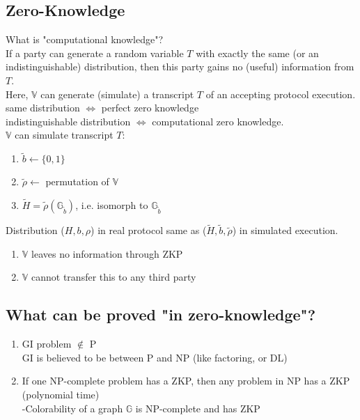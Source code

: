 \documentclass{report}
\begin{document}
		\subsection{Zero-Knowledge}
		\startsubsection
			What is "computational knowledge"? \\
			If a party can generate a random variable $T$ with exactly the same (or an indistinguishable) distribution, then this party gains no (useful) information from $T$. \\
			Here, $\mathbb{V}$ can generate (simulate) a transcript $T$ of an accepting protocol execution. \\
			same distribution $\Leftrightarrow$ perfect zero knowledge \\
			indistinguishable distribution $\Leftrightarrow$ computational zero knowledge. \\
			$\mathbb{V}$ can simulate transcript $T$:
			\begin{enumerate}
				\item $\tilde{b} \leftarrow \{ 0,1 \}$
				\item $\tilde{\rho} \leftarrow$ permutation of $\mathbb{V}$
				\item $\tilde{H} = \tilde{\rho} (\mathbb{G}_{\tilde{b}})$, i.e. isomorph to $\mathbb{G}_{\tilde{b}}$
			\end{enumerate}
			Distribution ($H, b, \rho$) in real protocol same as ($\tilde{H}, \tilde{b}, \tilde{\rho}$) in simulated execution.
			\begin{enumerate}[$\Rightarrow$]
				\item $\mathbb{V}$ leaves no information through ZKP
				\item $\mathbb{V} $ cannot transfer this to any third party
			\end{enumerate}
		\closesection
		\subsection{What can be proved "in zero-knowledge"?}
		\startsubsection
			\begin{enumerate}[-]
				\item GI problem $\not\in$ P \\
				\indent GI is believed to be between P and NP (like factoring, or DL)
				\item If one NP-complete problem has a ZKP, then any problem in NP has a ZKP (polynomial time) \\
				-Colorability of a graph $\mathbb{G}$ is NP-complete and has ZKP
			\end{enumerate}
		\closesection
\end{document}
